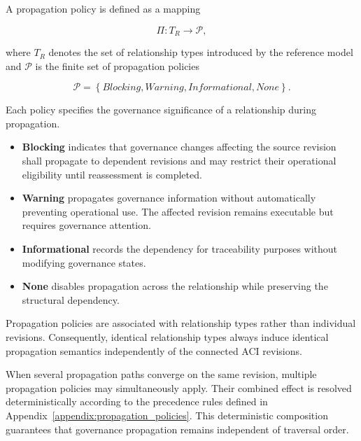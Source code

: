 \documentclass[10pt]{article}
\begin{document}
	A propagation policy is defined as a mapping
	
	\begin{equation}
		\Pi : T_R \rightarrow \mathcal{P},
		\label{eq:policy_mapping}
	\end{equation}
	
	where $T_R$ denotes the set of relationship types introduced by the reference model and $\mathcal{P}$ is the finite set of propagation policies
	
	\begin{equation}
		\mathcal{P}=
		\left\{
		\textit{Blocking},
		\textit{Warning},
		\textit{Informational},
		\textit{None}
		\right\}.
		\label{eq:policy_space}
	\end{equation}
	
	Each policy specifies the governance significance of a relationship during propagation.
	
	\begin{itemize}
		\item \textbf{Blocking} indicates that governance changes affecting the source revision shall propagate to dependent revisions and may restrict their operational eligibility until reassessment is completed.
		
		\item \textbf{Warning} propagates governance information without automatically preventing operational use. The affected revision remains executable but requires governance attention.
		
		\item \textbf{Informational} records the dependency for traceability purposes without modifying governance states.
		
		\item \textbf{None} disables propagation across the relationship while preserving the structural dependency.
	\end{itemize}
	
	Propagation policies are associated with relationship types rather than individual revisions. Consequently, identical relationship types always induce identical propagation semantics independently of the connected ACI revisions.
	
	When several propagation paths converge on the same revision, multiple propagation policies may simultaneously apply. Their combined effect is resolved deterministically according to the precedence rules defined in Appendix~\ref{appendix:propagation_policies}. This deterministic composition guarantees that governance propagation remains independent of traversal order.
	
\end{document}
